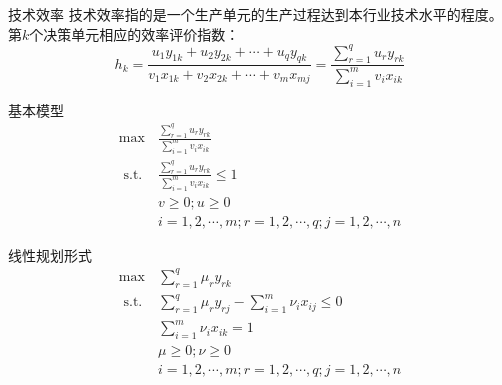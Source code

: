 \documentclass[]{beamer}
\begin{document}
\begin{frame}{技术效率}
技术效率指的是一个生产单元的生产过程达到本行业技术水平的程度。
第$k$个决策单元相应的效率评价指数：
$$
h_k=\frac{u_1 y_{1 k}+u_2 y_{2 k}+\cdots+u_q y_{q k}}{v_1 x_{1 k}+v_2 x_{2 k}+\cdots+v_m x_{m j}}=\frac{\displaystyle \sum_{r=1}^q u_r y_{r k}}{\displaystyle \sum_{i=1}^m v_i x_{i k}}
$$
\end{frame}

\begin{frame}{基本模型}
    \begin{align*}
        \max & \frac{\displaystyle \sum_{r=1}^q u_r y_{r k}}{\displaystyle \sum_{i=1}^m v_i x_{i k}} \\
        \text { s.t. } & \frac{\displaystyle \sum_{r=1}^q u_r y_{r k}}{\displaystyle \sum_{i=1}^m v_i x_{i k}} \leq 1 \\
        & v \geq 0 ; u \geq 0 \\
        & i=1,2, \cdots, m ; r=1,2, \cdots, q ; j=1,2, \cdots, n
    \end{align*}

\end{frame}

\begin{frame}{线性规划形式}
    \begin{align*}
        \max & \sum_{r=1}^q \mu_r y_{r k} \\
        \text { s.t. } & \sum_{r=1}^q \mu_r y_{r j}-\sum_{i=1}^m \nu_i x_{i j} \leq 0 \\
        & \sum_{i=1}^m \nu_i x_{i k}=1 \\
        & \mu \geq 0 ; \nu \geq 0 \\
        & i=1,2, \cdots, m ; r=1,2, \cdots, q ; j=1,2, \cdots, n
    \end{align*}
\end{frame}

\end{document}
